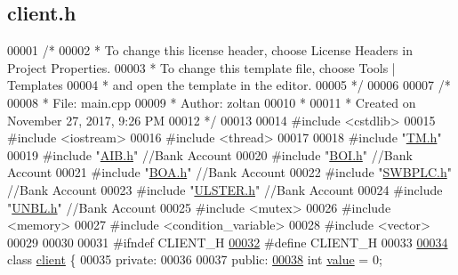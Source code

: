 \hypertarget{client_8h_source}{}\subsection{client.\+h}

\begin{DoxyCode}
00001 \textcolor{comment}{/*}
00002 \textcolor{comment}{ * To change this license header, choose License Headers in Project Properties.}
00003 \textcolor{comment}{ * To change this template file, choose Tools | Templates}
00004 \textcolor{comment}{ * and open the template in the editor.}
00005 \textcolor{comment}{ */}
00006 
00007 \textcolor{comment}{/*}
00008 \textcolor{comment}{ * File:   main.cpp}
00009 \textcolor{comment}{ * Author: zoltan}
00010 \textcolor{comment}{ *}
00011 \textcolor{comment}{ * Created on November 27, 2017, 9:26 PM}
00012 \textcolor{comment}{ */}
00013 
00014 \textcolor{preprocessor}{#include <cstdlib>}
00015 \textcolor{preprocessor}{#include <iostream>}
00016 \textcolor{preprocessor}{#include <thread>}
00017 
00018 \textcolor{preprocessor}{#include "\hyperlink{_t_m_8h}{TM.h}"}
00019 \textcolor{preprocessor}{#include "\hyperlink{_a_i_b_8h}{AIB.h}"}    \textcolor{comment}{//Bank Account}
00020 \textcolor{preprocessor}{#include "\hyperlink{_b_o_i_8h}{BOI.h}"}    \textcolor{comment}{//Bank Account}
00021 \textcolor{preprocessor}{#include "\hyperlink{_b_o_a_8h}{BOA.h}"}    \textcolor{comment}{//Bank Account}
00022 \textcolor{preprocessor}{#include "\hyperlink{_s_w_b_p_l_c_8h}{SWBPLC.h}"} \textcolor{comment}{//Bank Account}
00023 \textcolor{preprocessor}{#include "\hyperlink{_u_l_s_t_e_r_8h}{ULSTER.h}"} \textcolor{comment}{//Bank Account}
00024 \textcolor{preprocessor}{#include "\hyperlink{_u_n_b_l_8h}{UNBL.h}"}   \textcolor{comment}{//Bank Account}
00025 \textcolor{preprocessor}{#include <mutex>}
00026 \textcolor{preprocessor}{#include <memory>}
00027 \textcolor{preprocessor}{#include <condition\_variable>}
00028 \textcolor{preprocessor}{#include <vector>}
00029 
00030 
00031 \textcolor{preprocessor}{#ifndef CLIENT\_H}
\hypertarget{client_8h_source.tex_l00032}{}\hyperlink{client_8h_a1fa906461dbe27288865313d90234ec2_a1fa906461dbe27288865313d90234ec2}{00032} \textcolor{preprocessor}{#define CLIENT\_H}
00033 
\hypertarget{client_8h_source.tex_l00034}{}\hyperlink{classclient}{00034} \textcolor{keyword}{class }\hyperlink{classclient}{client} \{
00035 \textcolor{keyword}{private}:
00036       
00037 \textcolor{keyword}{public}:
\hypertarget{client_8h_source.tex_l00038}{}\hyperlink{classclient_a30e2070077d9ba875bfa6616a43d879c_a30e2070077d9ba875bfa6616a43d879c}{00038}     \textcolor{keywordtype}{int} \hyperlink{classclient_a30e2070077d9ba875bfa6616a43d879c_a30e2070077d9ba875bfa6616a43d879c}{value} = 0;

\end{DoxyCode}
